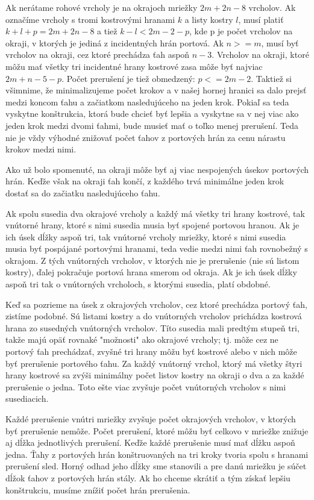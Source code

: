 Ak nerátame rohové vrcholy je na okrajoch mriežky $2m + 2n - 8$ vrcholov. 
Ak označíme vrcholy s tromi
kostrovými hranami $k$ a listy kostry $l$, musí platiť $k + l + p = 2m + 2n
- 8$ a tiež $k - l < 2m - 2 - p$, kde p je počet vrcholov na okraji, v
ktorých je jediná z incidentných hrán portová.
Ak $n >= m$, musí byť vrcholov na okraji, cez ktoré prechádza ťah aspoň $n-3$.
Vrcholov na okraji, ktoré môžu mať všetky tri incidentné hrany kostrové zasa
môže byť najviac $2m + n - 5 - p$. Počet prerušení je tiež obmedzený: $p <=
2m - 2$. Taktiež si všimnime, že minimalizujeme počet krokov a v našej
hornej hranici sa dalo prejsť medzi koncom ťahu a začiatkom nasledujúceho na
jeden krok. Pokiaľ sa teda vyskytne konštrukcia, ktorá bude chcieť byť
lepšia a vyskytne sa v nej viac ako jeden krok medzi dvomi ťahmi, bude
musieť mať o toľko menej prerušení. Teda nie je vždy výhodné znižovať počet
ťahov z portových hrán za cenu nárastu krokov medzi nimi.

Ako už bolo spomenuté, na okraji môže byť aj viac nespojených úsekov
portových hrán. Keďže však na okraji ťah končí, z každého trvá minimálne
jeden krok dostať sa do začiatku nasledujúceho ťahu.

Ak spolu susedia dva okrajové vrcholy a každý má všetky tri hrany kostrové,
tak vnútorné hrany, ktoré s nimi susedia musia byť spojené portovou hranou.
Ak je ich úsek dĺžky aspoň tri, tak vnútorné vrcholy mriežky, ktoré s nimi
susedia musia byť pospájané portovými hranami, teda vedie medzi nimi ťah
rovnobežný s okrajom. Z tých vnútorných vrcholov, v ktorých nie je
prerušenie (nie sú listom kostry), ďalej pokračuje portová hrana smerom od
okraja. Ak je ich úsek dĺžky aspoň tri tak o vnútorných vrcholoch, s ktorými
susedia, platí obdobné.

Keď sa pozrieme na úsek z okrajových vrcholov, cez ktoré prechádza portový
ťah, zistíme podobné. Sú listami kostry a do vnútorných vrcholov prichádza
kostrová hrana zo susedných vnútorných vrcholov. Títo susedia mali predtým
stupeň tri, takže majú opäť rovnaké "možnosti" ako okrajové vrcholy; tj.
môže cez ne portový ťah prechádzať, zvyšné tri hrany môžu byť kostrové
alebo v nich môže byť prerušenie portového ťahu. Za každý vnútorný vrchol,
ktorý má všetky štyri hrany kostrové sa zvýši minimálny počet listov kostry
na okraji o dva a za každé prerušenie o jedna. Toto ešte viac zvyšuje počet
vnútorných vrcholov s nimi susediacich.

Každé prerušenie vnútri mriežky zvyšuje počet okrajových vrcholov, v ktorých
byť prerušenie nemôže. Počet prerušení, ktoré môžu byť celkovo v mriežke
znižuje aj dĺžka jednotlivých prerušení. Keďže každé prerušenie musí mať dĺžku
aspoň jedna. Ťahy z portových hrán konštruovaných na tri kroky tvoria spolu
s hranami prerušení sled. Horný odhad jeho dĺžky sme stanovili a pre danú
mriežku je súčet dĺžok ťahov z portových hrán stály. Ak ho chceme skrátiť a
tým získať lepšiu konštrukciu, musíme znížiť počet hrán prerušenia.

